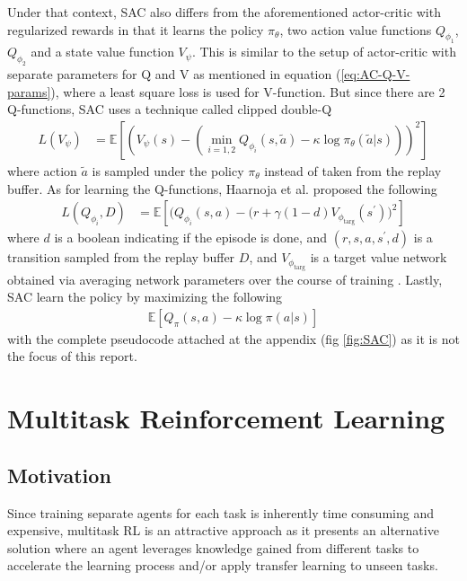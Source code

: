 \documentclass[12pt]{report}
\begin{document}
Under that context, SAC also differs from the aforementioned actor-critic with regularized rewards in that it learns the policy $\pi_\theta$, two action value functions $Q_{\phi_1}$, $Q_{\phi_2}$ and a state value function $V_\psi$. This is similar to the setup of actor-critic with separate parameters for Q and V as mentioned in equation (\ref{eq:AC-Q-V-params}), where a least square loss is used for V-function. But since there are 2 Q-functions, SAC uses a technique called clipped double-Q \cite{haarnoja2018soft1} \cite{spinningupRL}
\begin{align}
    L(V_\psi) &= \mathbb{E}\left[\left(V_\psi(s)-\left(\min_{i=1,2}Q_{\phi_i}(s,\tilde{a})-\kappa \log \pi_\theta(\tilde{a}|s)\right)\right)^2\right]
\end{align}
where action $\tilde{a}$ is sampled under the policy $\pi_\theta$ instead of taken from the replay buffer. As for learning the Q-functions, Haarnoja et al. \cite{haarnoja2018soft1} proposed the following
\begin{align}
    L(Q_{\phi_i},D) &= \mathbb{E}\left[\Big(Q_{\phi_i}(s,a)-(r+\gamma(1-d)V_{\phi_\text{targ}}(s^\prime)\Big)^2\right]
\end{align}
where $d$ is a boolean indicating if the episode is done, and $(r,s,a,s^\prime,d)$ is a transition sampled from the replay buffer $D$, and $V_{\phi_\text{targ}}$ is a target value network obtained via averaging network parameters over the course of training \cite{haarnoja2018soft}. Lastly, SAC learn the policy by maximizing the following
\begin{align}
    \mathbb{E}\left[Q_\pi(s,a)-\kappa \log\pi(a|s)\right]
\end{align}
with the complete pseudocode attached at the appendix (fig \ref{fig:SAC}) as it is not the focus of this report.

\section{Multitask Reinforcement Learning}
\subsection{Motivation}

Since training separate agents for each task is inherently time consuming and expensive, multitask RL is an attractive approach as it presents an alternative solution where an agent leverages knowledge gained from different tasks to accelerate the learning process and/or apply transfer learning to unseen tasks.\\
\end{document}
